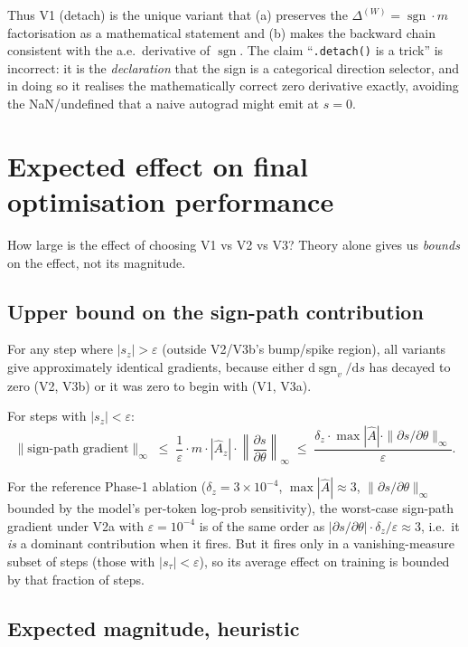 \documentclass[11pt]{article}
\DeclareMathOperator{\sign}{sgn}
\newcommand{\dif}{\mathrm{d}}
\begin{document}
Thus V1 (detach) is the unique variant that (a) preserves the
$\Delta^{(W)} = \sign\cdot m$ factorisation as a mathematical statement
and (b) makes the backward chain consistent with the a.e.\ derivative of
$\sign$. The claim ``\texttt{.detach()} is a trick'' is incorrect: it is
the \emph{declaration} that the sign is a categorical direction selector,
and in doing so it realises the mathematically correct zero derivative
exactly, avoiding the NaN/undefined that a naive autograd might emit at
$s=0$.

\section{Expected effect on final optimisation performance}
\label{sec:effect}

How large is the effect of choosing V1 vs V2 vs V3? Theory alone gives us
\emph{bounds} on the effect, not its magnitude.

\subsection{Upper bound on the sign-path contribution}

For any step where $|s_z| > \varepsilon$ (outside V2/V3b's bump/spike
region), all variants give approximately identical gradients, because
either $\dif\sign_v/\dif s$ has decayed to zero (V2, V3b) or it was zero
to begin with (V1, V3a).

For steps with $|s_z| < \varepsilon$:
\[
\bigl\|\text{sign-path gradient}\bigr\|_{\infty}
\;\leq\; \frac{1}{\varepsilon}\cdot m\cdot|\hat A_z|\cdot\left\|\frac{\partial s}{\partial\theta}\right\|_\infty
\;\leq\; \frac{\delta_z\cdot\max|\hat A|\cdot\|\partial s/\partial\theta\|_\infty}{\varepsilon}.
\]

For the reference Phase-1 ablation ($\delta_z = 3\times 10^{-4}$,
$\max|\hat A|\approx 3$, $\|\partial s/\partial\theta\|_\infty$ bounded
by the model's per-token log-prob sensitivity), the worst-case
sign-path gradient under V2a with $\varepsilon = 10^{-4}$ is of the same
order as $|\partial s/\partial\theta|\cdot\delta_z/\varepsilon \approx 3$,
i.e.\ it \emph{is} a dominant contribution when it fires. But it fires
only in a vanishing-measure subset of steps (those with $|s_\tau| <
\varepsilon$), so its average effect on training is bounded by that
fraction of steps.

\subsection{Expected magnitude, heuristic}
\end{document}
